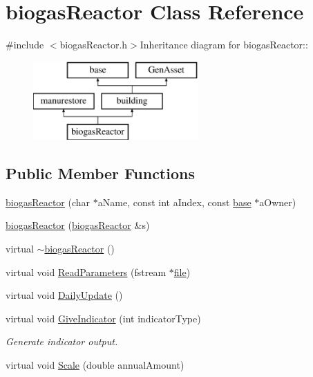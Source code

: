 \hypertarget{classbiogas_reactor}{
\section{biogasReactor Class Reference}
\label{classbiogas_reactor}
}


{\ttfamily \#include $<$biogasReactor.h$>$}Inheritance diagram for biogasReactor::\begin{figure}[H]
\begin{center}
\leavevmode
\includegraphics[height=3cm]{classbiogas_reactor}
\end{center}
\end{figure}
\subsection*{Public Member Functions}
\begin{DoxyCompactItemize}
\item 
\hyperlink{classbiogas_reactor_a5e4dd42a6bd6ad49460dd9581bdc599f}{biogasReactor} (char $\ast$aName, const int aIndex, const \hyperlink{classbase}{base} $\ast$aOwner)
\item 
\hyperlink{classbiogas_reactor_afdb23c10eef5692834128bfcff11d9f5}{biogasReactor} (\hyperlink{classbiogas_reactor}{biogasReactor} \&s)
\item 
virtual \hyperlink{classbiogas_reactor_abef592b8c00da8bdf44067f049babfc4}{$\sim$biogasReactor} ()
\item 
virtual void \hyperlink{classbiogas_reactor_aafc4e774b0d67a08d3f55c566e5a58b7}{ReadParameters} (fstream $\ast$\hyperlink{classbase_a3af52ee9891719d09b8b19b42450b6f6}{file})
\item 
virtual void \hyperlink{classbiogas_reactor_ae8242ee2ab7dd6495125af9720b54aa4}{DailyUpdate} ()
\item 
virtual void \hyperlink{classbiogas_reactor_ab2482d657ec9095da5aef508d0841e0e}{GiveIndicator} (int indicatorType)
\begin{DoxyCompactList}\small\item\em Generate indicator output. \item\end{DoxyCompactList}\item 
virtual void \hyperlink{classbiogas_reactor_a479439eabed31849643a005f9f6eb66d}{Scale} (double annualAmount)
\end{DoxyCompactItemize}
